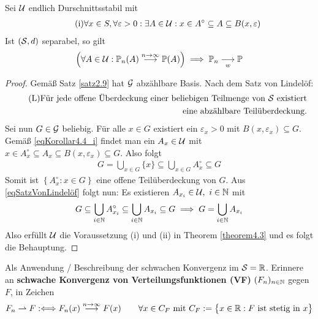 \begin{korollar}\label{korollar4.4}
	Sei $\U$ endlich Durschnittsstabil mit
	\begin{align}\label{eqKorollar4.4_i}\tag{i}
		\forall x\in S,\forall\varepsilon>0:\exists A\in\U:x\in A^\circ\subseteq A\subseteq B(x,\varepsilon)
	\end{align}
	Ist $(\S,d)$ separabel, so gilt
	\begin{align*}
		\Big(\forall A\in\U:\P_n(A)\stackrel{n\to\infty}{\longrightarrow} \P(A)\Big)
		\implies \P_n\stackrelnew{w}{}{\longrightarrow} \P
	\end{align*}
\end{korollar}

\begin{proof}
	Gemäß Satz \ref{satz2.9} hat $\G$ abzählbare Basis. 
	Nach dem Satz von Lindelöf:
	\begin{align}\label{eqSatzVonLindelöf}\tag{L}
		\text{Für jede offene Überdeckung einer beliebigen Teilmenge von $\S$ existiert}\\\nonumber\text{eine abzählbare Teilüberdeckung.}
	\end{align}
	Sei nun $G\in\G$ beliebig. 
	Für alle $x\in G$ existiert ein $\varepsilon_x>0$ mit $B(x,\varepsilon_x)\subseteq G$.
	Gemäß \eqref{eqKorollar4.4_i} findet man ein $A_x\in\U$ mit $x\in A_x^\circ\subseteq A_x\subseteq B(x,\varepsilon_x)\subseteq G$. 
	Also folgt
	\begin{align*}
		G=\bigcup\limits_{x\in G}\lbrace x\rbrace\subseteq\bigcup\limits_{x\in G}A^\circ_x\subseteq G
	\end{align*}
	Somit ist $\left\lbrace A^\circ_x:x\in G\right\rbrace$ eine offene Teilüberdeckung von $G$. 
	Aus \eqref{eqSatzVonLindelöf} folgt nun: 
	Es existieren $A_{x_i}\in\U,~i\in\N$ mit
	\begin{align*}
		G\subseteq\bigcup\limits_{i\in\N} A^\circ_{x_i}\subseteq 
		\bigcup\limits_{i\in\N}A_{x_i}\subseteq 
		G
		\implies
		G=\bigcup\limits_{i\in\N}A_{x_i}
	\end{align*}
	Also erfüllt $\U$ die Voraussetzung (i) und (ii) in Theorem \ref{theorem4.3} und es folgt die Behauptung.
\end{proof}

Als Anwendung / Beschreibung der schwachen Konvergenz im $\S=\R$. 
Erinnere an \textbf{schwache Konvergenz von Verteilungsfunktionen (VF)} $(F_n)_{n\in\N}$ gegen $F$, in Zeichen
\begin{align*}
	F_n\rightharpoonup F
	:\Longleftrightarrow
	F_n(x)\stackrel{n\to\infty}{\longrightarrow} F(x)\qquad\forall x\in C_F
	\mit C_F:=\big\lbrace x\in\R:F\text{ ist stetig in }x\big\rbrace
\end{align*}

